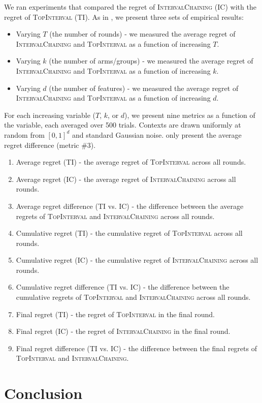 \documentclass[11pt]{article}
\begin{document}
We ran experiments that compared the regret of \textsc{IntervalChaining} (IC) with the regret of \textsc{TopInterval} (TI). As in , we present three sets of empirical results: 
\begin{itemize}
	\item Varying $T$ (the number of rounds) - we measured the average regret of \textsc{IntervalChaining} and \textsc{TopInterval} as a function of increasing $T$.
	\item Varying $k$ (the number of arms/groups) - we measured the average regret of \textsc{IntervalChaining} and \textsc{TopInterval} as a function of increasing $k$.
	\item Varying $d$ (the number of features) - we measured the average regret of \textsc{IntervalChaining} and \textsc{TopInterval} as a function of increasing $d$.
\end{itemize} 

For each increasing variable ($T$, $k$, or $d$), we present nine metrics as a function of the variable, each averaged over 500 trials. Contexts are drawn uniformly at random from $[0,1]^d$ and standard Gaussian noise.  only present the average regret difference (metric \#3).
\begin{enumerate}
	\item Average regret (TI) - the average regret of \textsc{TopInterval} across all rounds.
	\item Average regret (IC) - the average regret of \textsc{IntervalChaining} across all rounds.
	\item Average regret difference (TI vs. IC) - the difference between the average regrets of \textsc{TopInterval} and \textsc{IntervalChaining} across all rounds.
	\item Cumulative regret (TI) - the cumulative regret of \textsc{TopInterval} across all rounds.
	\item Cumulative regret (IC) - the cumulative regret of \textsc{IntervalChaining} across all rounds.
	\item Cumulative regret difference (TI vs. IC) - the difference between the cumulative regrets of \textsc{TopInterval} and \textsc{IntervalChaining} across all rounds.
	\item Final regret (TI) - the regret of \textsc{TopInterval} in the final round.
	\item Final regret (IC) - the regret of \textsc{IntervalChaining} in the final round.
	\item Final regret difference (TI vs. IC) - the difference between the final regrets of \textsc{TopInterval} and \textsc{IntervalChaining}.
\end{enumerate}

\section{Conclusion}



\end{document}

